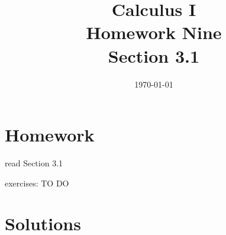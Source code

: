 \documentclass[letterpaper, landscape]{exam}
\title{Calculus I \\ Homework Nine \\ Section 3.1}
\author{}
\date{\today}
\begin{document}
  \maketitle

  \section{Homework}
    \begin{itemize*}
      \item read Section 3.1
      \item exercises: TO DO
    \end{itemize*}

  \ifprintanswers

  \section{Solutions}
\end{document}
